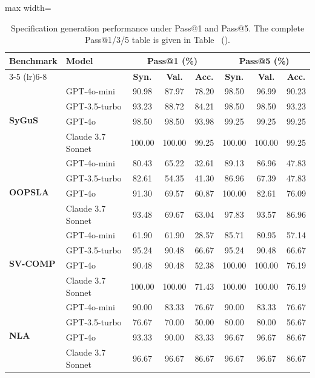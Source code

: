 



\begin{table}[t]
\centering
\caption{Specification generation performance under Pass@1 and Pass@5. The complete Pass@1/3/5 table is given in Table~ ().}
\label{tab:performance_rates_model}
\small
\setlength{\tabcolsep}{2.5pt}
\begin{adjustbox}{max width=\linewidth}
\begin{tabular}{ll ccc ccc}
\toprule
\multirow{2}{*}{\textbf{Benchmark}} & \multirow{2}{*}{\textbf{Model}}
& \multicolumn{3}{c}{\textbf{Pass@1 (\%)}}
& \multicolumn{3}{c}{\textbf{Pass@5 (\%)}} \\
\cmidrule(lr){3-5} \cmidrule(lr){6-8}
& & \textbf{Syn.} & \textbf{Val.} & \textbf{Acc.}
& \textbf{Syn.} & \textbf{Val.} & \textbf{Acc.} \\
\midrule

\multirow{4}{*}{\textbf{SyGuS}}
 & GPT-4o-mini & 90.98 & 87.97 & 78.20 & 98.50 & 96.99 & 90.23 \\
 & GPT-3.5-turbo & 93.23 & 88.72 & 84.21 & 98.50 & 98.50 & 93.23 \\
 & GPT-4o & 98.50 & 98.50 & 93.98 & 99.25 & 99.25 & 99.25 \\
 & Claude 3.7 Sonnet & 100.00 & 100.00 & 99.25 & 100.00 & 100.00 & 99.25 \\
    \midrule

\multirow{4}{*}{\textbf{OOPSLA}}
 & GPT-4o-mini & 80.43 & 65.22 & 32.61 & 89.13 & 86.96 & 47.83 \\
 & GPT-3.5-turbo & 82.61 & 54.35 & 41.30 & 86.96 & 67.39 & 47.83 \\
 & GPT-4o & 91.30 & 69.57 & 60.87 & 100.00 & 82.61 & 76.09 \\
 & Claude 3.7 Sonnet & 93.48 & 69.67 & 63.04 & 97.83 & 93.57 & 86.96 \\
\midrule

\multirow{4}{*}{\textbf{SV-COMP}}
 & GPT-4o-mini & 61.90 & 61.90 & 28.57 & 85.71 & 80.95 & 57.14 \\
 & GPT-3.5-turbo & 95.24 & 90.48 & 66.67 & 95.24 & 90.48 & 66.67 \\
 & GPT-4o & 90.48 & 90.48 & 52.38 & 100.00 & 100.00 & 76.19 \\
 & Claude 3.7 Sonnet & 100.00 & 100.00 & 71.43 & 100.00 & 100.00 & 76.19 \\
\midrule

\multirow{4}{*}{\textbf{NLA}}
 & GPT-4o-mini & 90.00 & 83.33 & 76.67 & 90.00 & 83.33 & 76.67 \\
 & GPT-3.5-turbo & 76.67 & 70.00 & 50.00 & 80.00 & 80.00 & 56.67 \\
& GPT-4o & 93.33 & 90.00 & 83.33 & 96.67 & 96.67 & 86.67 \\
& Claude 3.7 Sonnet & 96.67 & 96.67 & 86.67 & 96.67 & 96.67 & 86.67 \\
\midrule


\end{tabular}
\end{adjustbox}
\end{table}
